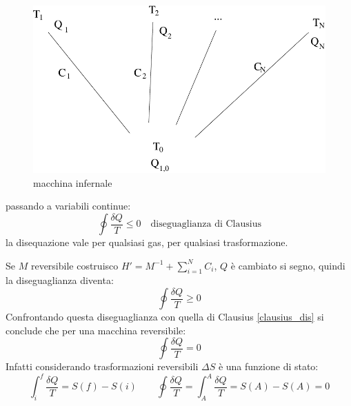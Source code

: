 \begin{figure}[htbp]
\centering
\includegraphics[scale=0.5]{immagini/fisica1/hell_machine}
\caption{macchina infernale}
\label{fig:hell_machine}
\end{figure}

passando a variabili continue:
\begin{equation}
\oint\frac{\delta Q}{T}\leq 0\quad\text{diseguaglianza di Clausius}
\label{clausius_dis}
\end{equation}
la disequazione vale per qualsiasi gas, per qualsiasi trasformazione.

Se $M$ reversibile costruisco $H'=M^{-1}+\sum_{i=1}^N C_i$, $Q$ è cambiato si segno, quindi la diseguaglianza diventa:
\[\oint\frac{\delta Q}{T}\geq0\]
Confrontando questa diseguaglianza con quella di Clausius \eqref{clausius_dis} si conclude che per una macchina reversibile:
\begin{equation}
\oint\frac{\delta Q}{T}=0
\end{equation}
Infatti considerando trasformazioni reversibili $\Delta S$ è una funzione di stato:
\[\int_i^f\frac{\delta Q}{T}=S(f)-S(i)\qquad\oint\frac{\delta Q}{T}=\int_A^A\frac{\delta Q}{T}=S(A)-S(A)=0\]

